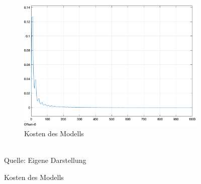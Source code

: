 \begin{figure}[h]
\begin{subfigure}[b]{0.3\textwidth}
    \includegraphics[width=\textwidth]{abbildungen/c_ep_approx_convergence_kosten.png}
    \caption{Kosten des Modells}
  \end{subfigure}
  \\
  Quelle: Eigene Darstellung
  \label{fig:C-EP Annäherung Konvergenz}
\end{figure}
